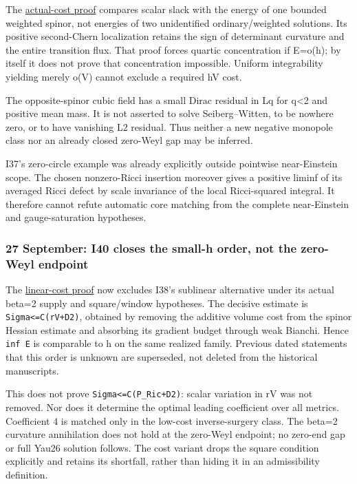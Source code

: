 \documentclass[
  10pt,
]{article}
\begin{document}
The
\href{../continuation/20260926_actual_topological_cost.md}{actual-cost
proof} compares scalar slack with the energy of one bounded weighted
spinor, not energies of two unidentified ordinary/weighted solutions.
Its positive second-Chern localization retains the sign of determinant
curvature and the entire transition flux. That proof forces quartic
concentration if E=o(h); by itself it does not prove that concentration
impossible. Uniform integrability yielding merely o(V) cannot exclude a
required hV cost.

The opposite-spinor cubic field has a small Dirac residual in Lq for
q\textless2 and positive mean mass. It is not asserted to solve
Seiberg--Witten, to be nowhere zero, or to have vanishing L2 residual.
Thus neither a new negative monopole class nor an already closed
zero-Weyl gap may be inferred.

I37's zero-circle example was already explicitly outside pointwise
near-Einstein scope. The chosen nonzero-Ricci insertion moreover gives a
positive liminf of its averaged Ricci defect by scale invariance of the
local Ricci-squared integral. It therefore cannot refute automatic core
matching from the complete near-Einstein and gauge-saturation
hypotheses.

\hypertarget{september-i40-closes-the-small-h-order-not-the-zero-weyl-endpoint}{%
\subsubsection{27 September: I40 closes the small-h order, not the
zero-Weyl
endpoint}\label{september-i40-closes-the-small-h-order-not-the-zero-weyl-endpoint}}

The
\href{../continuation/20260927_mixed_current_and_signed_cores.md}{linear-cost
proof} now excludes I38's sublinear alternative under its actual beta=2
supply and square/window hypotheses. The decisive estimate is
\texttt{Sigma\textless{}=C(rV+D2)}, obtained by removing the additive
volume cost from the spinor Hessian estimate and absorbing its gradient
budget through weak Bianchi. Hence \texttt{inf\ E} is comparable to h on
the same realized family. Previous dated statements that this order is
unknown are superseded, not deleted from the historical manuscripts.

This does not prove \texttt{Sigma\textless{}=C(P\_Ric+D2)}: scalar
variation in rV was not removed. Nor does it determine the optimal
leading coefficient over all metrics. Coefficient 4 is matched only in
the low-cost inverse-surgery class. The beta=2 curvature annihilation
does not hold at the zero-Weyl endpoint; no zero-end gap or full Yau26
solution follows. The cost variant drops the square condition explicitly
and retains its shortfall, rather than hiding it in an admissibility
definition.
\end{document}
